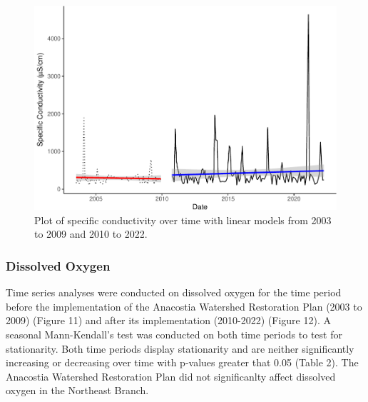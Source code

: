 \documentclass[
  12pt,
]{article}
\begin{document}
\newpage

\begin{figure}

{\centering \includegraphics{Project_Template_files/figure-latex/Plot of Specific Conductance over time with LMs-1} 

}

\caption{Plot of specific conductivity over time with linear models from 2003 to 2009 and 2010 to 2022.}\label{fig:Plot of Specific Conductance over time with LMs}
\end{figure}

\newpage

\hypertarget{dissolved-oxygen}{%
\subsubsection{Dissolved Oxygen}\label{dissolved-oxygen}}

Time series analyses were conducted on dissolved oxygen for the time
period before the implementation of the Anacostia Watershed Restoration
Plan (2003 to 2009) (Figure 11) and after its implementation (2010-2022)
(Figure 12). A seasonal Mann-Kendall's test was conducted on both time
periods to test for stationarity. Both time periods display stationarity
and are neither significantly increasing or decreasing over time with
p-values greater that 0.05 (Table 2). The Anacostia Watershed
Restoration Plan did not significanlty affect dissolved oxygen in the
Northeast Branch.
\end{document}
